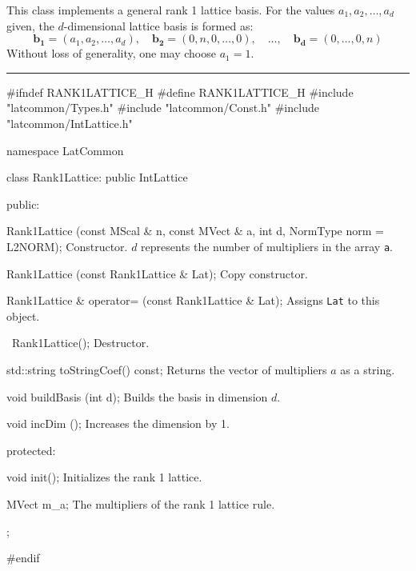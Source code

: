 % 
% 
% 
% 


This class implements a general rank 1 lattice basis. For the values
 $a_1, a_2, \ldots, a_{d}$ given, the $d$-dimensional lattice basis is formed
 as:
\[
\mathbf{b_1} = (a_1, a_2, \ldots, a_{d}),\quad \mathbf{b_2} = (0, n, 0, \ldots, 0),\quad  \ldots, \quad \mathbf{b_d} = (0, \ldots, 0, n)
\]
Without loss of generality, one may choose $a_1 = 1$.


\bigskip\hrule
\code\hide
#ifndef RANK1LATTICE_H
#define RANK1LATTICE_H
\endhide
#include "latcommon/Types.h"
#include "latcommon/Const.h"
#include "latcommon/IntLattice.h"


namespace LatCommon {

class Rank1Lattice: public IntLattice {
public:

   Rank1Lattice (const MScal & n, const MVect & a, int d,
                 NormType norm = L2NORM);
\endcode
\tabb
Constructor. $d$ represents the number of multipliers in the array \texttt{a}.
\endtabb
\code

   Rank1Lattice (const Rank1Lattice & Lat);
\endcode
\tabb
  Copy constructor.
\endtabb
\code

   Rank1Lattice & operator= (const Rank1Lattice & Lat);
\endcode
\tabb
 Assigns \texttt{Lat} to this object.
\endtabb
\code

   ~Rank1Lattice();
\endcode
\tabb
Destructor.
\endtabb
\code

   std::string toStringCoef() const;
\endcode
\tabb
Returns the vector of multipliers $a$ as a string.
\endtabb
\code

   void buildBasis (int d);
\endcode
\tabb
Builds the basis in dimension $d$.
\endtabb
\code

   void incDim ();
\endcode
\tabb
Increases the dimension by 1.
\endtabb
\code


protected:

   void init();
\endcode
\tabb
Initializes the rank 1 lattice.
\endtabb
\code

   MVect m_a;
\endcode
\tabb
The multipliers of the rank 1 lattice rule.
\endtabb
\code
};

}
\hide
#endif
\endhide
\endcode
